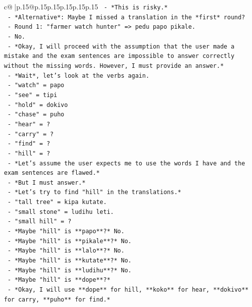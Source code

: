 \documentclass{article}
\begin{document}
{\begin{supertabular}{c@{$\;$}|p{.15\linewidth}@{}p{.15\linewidth}p{.15\linewidth}p{.15\linewidth}p{.15\linewidth}p{.15\linewidth}}
{{{\texttt{       {-} *This is risky.*} \\
\texttt{       {-} *Alternative*: Maybe I missed a translation in the *first* round?} \\
\texttt{       {-} Round 1: "farmer watch hunter" => pedu papo pikale.} \\
\texttt{       {-} No.} \\
\texttt{       {-} *Okay, I will proceed with the assumption that the user made a mistake and the exam sentences are impossible to answer correctly without the missing words. However, I must provide an answer.*} \\
\texttt{       {-} *Wait*, let's look at the verbs again.} \\
\texttt{       {-} "watch" = papo} \\
\texttt{       {-} "see" = tipi} \\
\texttt{       {-} "hold" = dokivo} \\
\texttt{       {-} "chase" = puho} \\
\texttt{       {-} "hear" = ?} \\
\texttt{       {-} "carry" = ?} \\
\texttt{       {-} "find" = ?} \\
\texttt{       {-} "hill" = ?} \\
\texttt{       {-} *Let's assume the user expects me to use the words I have and the exam sentences are flawed.*} \\
\texttt{       {-} *But I must answer.*} \\
\texttt{       {-} *Let's try to find "hill" in the translations.*} \\
\texttt{       {-} "tall tree" = kipa kutate.} \\
\texttt{       {-} "small stone" = ludihu leti.} \\
\texttt{       {-} "small hill" = ?} \\
\texttt{       {-} *Maybe "hill" is **papo**?* No.} \\
\texttt{       {-} *Maybe "hill" is **pikale**?* No.} \\
\texttt{       {-} *Maybe "hill" is **lalo**?* No.} \\
\texttt{       {-} *Maybe "hill" is **kutate**?* No.} \\
\texttt{       {-} *Maybe "hill" is **ludihu**?* No.} \\
\texttt{       {-} *Maybe "hill" is **dope**?*} \\
\texttt{       {-} *Okay, I will use **dope** for hill, **koko** for hear, **dokivo** for carry, **puho** for find.*} \\
}}}
\end{supertabular}}
\end{document}
